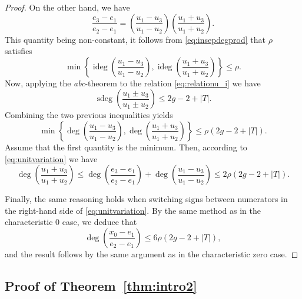 \documentclass[11pt]{article}
\theoremstyle{plain}
\theoremstyle{definition}
\DeclareMathOperator{\degi}{ideg}
\DeclareMathOperator{\degs}{sdeg}
\begin{document}
\begin{proof}
On the other hand, we have
\begin{equation}
\label{eq:unitvariation}
\frac{e_3 - e_1}{e_2 - e_1} = \left(\frac{u_1 - u_3}{u_1 - u_2}\right)\left(\frac{u_1 + u_3}{u_1 + u_2}\right).
\end{equation}
This quantity being non-constant, it follows from \eqref{eq:insepdegprod} that $\rho$ satisfies
$$
\min\left\{\degi\left(\frac{u_1 - u_3}{u_1 - u_2}\right),\degi\left(\frac{u_1 + u_3}{u_1 + u_2}\right)\right\} \leq \rho.
$$
Now, applying the \emph{abc}-theorem to the relation \eqref{eq:relationu_i} we have
$$
\degs\left(\frac{u_1 \pm u_3}{u_1 \pm u_2}\right) \leq 2g-2+|T|.
$$
Combining the two previous inequalities yields
$$
\min\left\{\deg\left(\frac{u_1 - u_3}{u_1 - u_2}\right),\deg\left(\frac{u_1 + u_3}{u_1 + u_2}\right)\right\} \leq \rho(2g-2+|T|).
$$
Assume that the first quantity is the minimum. Then, according to \eqref{eq:unitvariation} we have
$$
\deg\left(\frac{u_1 + u_3}{u_1 + u_2}\right) \leq \deg\left(\frac{e_3 - e_1}{e_2 - e_1}\right) + \deg\left(\frac{u_1 - u_3}{u_1 - u_2}\right) \leq 2\rho(2g-2+|T|).
$$

Finally, the same reasoning holds when switching signs between numerators in the right-hand side of \eqref{eq:unitvariation}. By the same method as in the characteristic $0$ case, we deduce that
$$
\deg\left(\frac{x_0-e_1}{e_2-e_1}\right) \leq 6\rho(2g-2+|T|),
$$
and the result follows by the same argument as in the characteristic zero case.
\end{proof}




\subsection{Proof of Theorem~\ref{thm:intro2}}
\label{sec:intro2proof}
\end{document}
